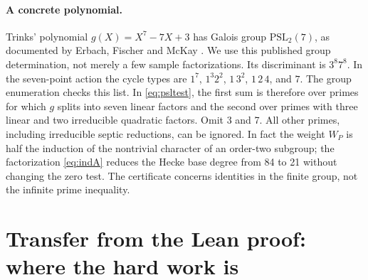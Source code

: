 \documentclass[11pt]{article}
\theoremstyle{remark}\newtheorem{remark}[theorem]{Remark}
\begin{document}
\paragraph{A concrete polynomial.} Trinks' polynomial $g(X)=X^7-7X+3$ has Galois group $\mathrm{PSL}_2(7)$, as documented by Erbach, Fischer and McKay \cite{trinks}. We use this published group determination, not merely a few sample factorizations. Its discriminant is $3^8 7^8$. In the seven-point action the cycle types are $1^7$, $1^3 2^2$, $1\,3^2$, $1\,2\,4$, and $7$. The group enumeration checks this list. In \eqref{eq:psltest}, the first sum is therefore over primes for which $g$ splits into seven linear factors and the second over primes with three linear and two irreducible quadratic factors. Omit 3 and 7. All other primes, including irreducible septic reductions, can be ignored. In fact the weight $W_P$ is half the induction of the nontrivial character of an order-two subgroup; the factorization \eqref{eq:indA} reduces the Hecke base degree from 84 to 21 without changing the zero test. The certificate concerns identities in the finite group, not the infinite prime inequality.

\section{Transfer from the Lean proof: where the hard work is}\label{sec:bridge}
\end{document}
